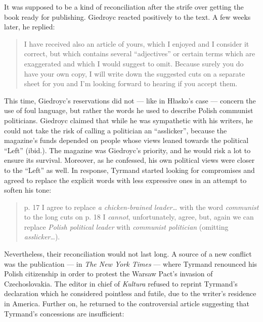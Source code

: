\begin{paper}
\noindent It was supposed to be a
kind of reconciliation after the strife over getting the book ready for
publishing. Giedroyc reacted positively to the text. A few weeks later, he replied: 

\begin{quote}
I have received also an
article of yours, which I enjoyed and I consider it correct, but which
contains several ``adjectives'' or certain terms which are exaggerated
and which I would suggest to omit. Because surely you do have your own
copy, I will write down the suggested cuts on a separate sheet for you
and I'm looking forward to hearing if you accept them. 
\begin{flushright}
\citep[31 July 1968]{tyrmand_kor_1966}
\end{flushright}

\end{quote}



\noindent This time, Giedroyc's reservations did
not --- like in Hłasko's case --- concern the use of foul language, but rather the words he used to describe Polish communist
politicians. Giedroyc claimed that while he was sympathetic with his writers, he
could not take the risk of calling a politician an ``asslicker'', because the magazine's funds
depended on people whose views leaned towards the political ``Left'' (ibid.). The
magazine was Giedroyc's priority, and he would risk a lot to ensure its
survival. Moreover, as he confessed, his own political views were closer to
the ``Left'' as well. In response, Tyrmand started looking for compromises and agreed
to replace the explicit words with less expressive ones in an attempt to soften his tone:

\begin{quote}
p. 17 I agree to replace \emph{a chicken-brained leader\ldots{}} with the
word \emph{communist}\\
to the long cuts on p. 18 I \emph{cannot}, unfortunately, agree, but,
again we can replace \emph{Polish political leader} with \emph{communist
politician} (omitting \emph{asslicker}\ldots{}).
\begin{flushright}
\citep[8 August 1968]{tyrmand_kor_1966}
\end{flushright}
\end{quote}

\noindent Nevertheless, their reconciliation would not last long. A source of a new conflict was the publication --- in
\emph{The New York Times} --- where  Tyrmand renounced his
Polish citizenship in order to protest the Warsaw Pact's invasion of
Czechoslovakia. The editor in chief of \emph{Kultura} refused to reprint
Tyrmand's declaration which he considered pointless and futile, due to the
writer's residence in America. Further on, he
returned to the controversial article suggesting that Tyrmand's
concessions are insufficient:


\end{paper}
